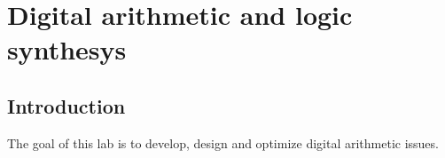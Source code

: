 %

\chapter{Digital arithmetic and logic synthesys}
\label{chap1}
\graphicspath{ {./chapters/chap1images/} }
\section{Introduction}
The goal of this lab is to develop, design and optimize digital arithmetic issues.

